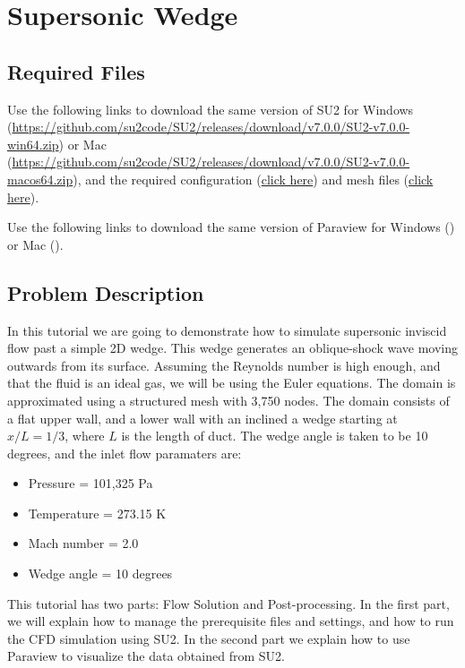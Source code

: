 \chapter{Supersonic Wedge}
\label{ch:Supersonic Wedge}
\section{Required Files}
\begin{su2note}
	Use the following links to download the same version of SU2 for Windows (\href{}{https://github.com/su2code/SU2/releases/download/v7.0.0/SU2-v7.0.0-win64.zip}) or Mac (\href{}{https://github.com/su2code/SU2/releases/download/v7.0.0/SU2-v7.0.0-macos64.zip}), and the required configuration (\href{}{click here}) and mesh files (\href{}{click here}).
\end{su2note}
\begin{paraviewnote}
	Use the following links to download the same version of Paraview for Windows (\href{}{}) or Mac (\href{}{}).
\end{paraviewnote}
\section{Problem Description}
In this tutorial we are going to demonstrate how to simulate supersonic inviscid flow past a simple 2D wedge. This wedge generates an oblique-shock wave moving outwards from its surface. Assuming the Reynolds number is high enough, and that the fluid is an ideal gas, we will be using the Euler equations. The domain is approximated using a structured mesh with 3,750 nodes. The domain consists of a flat upper wall, and a lower wall with an inclined a wedge starting at $x/L=1/3$, where $L$ is the length of duct. The wedge angle is taken to be 10 degrees, and the inlet flow paramaters are:
\begin{itemize}
    \item Pressure = 101,325 Pa
    \item Temperature = 273.15 K
    \item Mach number = 2.0
    \item Wedge angle = 10 degrees
\end{itemize}
This tutorial has two parts: Flow Solution and Post-processing. In the first part, we will explain how to manage the prerequisite files and settings, and how to run the CFD simulation using SU2. In the second part we explain how to use Paraview to visualize the data obtained from SU2.
